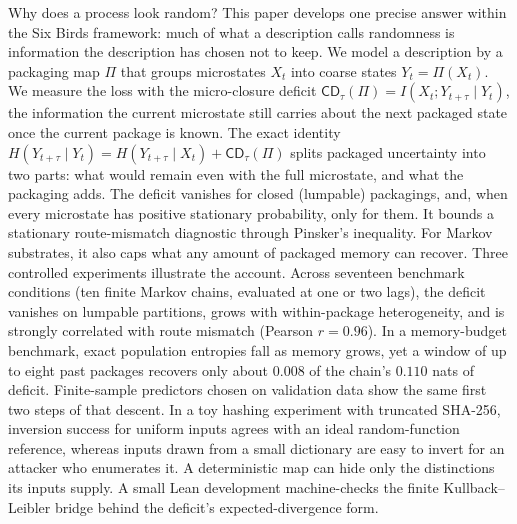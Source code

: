 Why does a process look random? This paper develops one precise answer within the Six Birds framework: much of what a description calls randomness is information the description has chosen not to keep. We model a description by a packaging map $\Pi$ that groups microstates $X_t$ into coarse states $Y_t=\Pi(X_t)$. We measure the loss with the micro-closure deficit $\mathsf{CD}_\tau(\Pi)=I(X_t;Y_{t+\tau}\mid Y_t)$, the information the current microstate still carries about the next packaged state once the current package is known. The exact identity $H(Y_{t+\tau}\mid Y_t)=H(Y_{t+\tau}\mid X_t)+\mathsf{CD}_\tau(\Pi)$ splits packaged uncertainty into two parts: what would remain even with the full microstate, and what the packaging adds. The deficit vanishes for closed (lumpable) packagings, and, when every microstate has positive stationary probability, only for them. It bounds a stationary route-mismatch diagnostic through Pinsker's inequality. For Markov substrates, it also caps what any amount of packaged memory can recover. Three controlled experiments illustrate the account. Across seventeen benchmark conditions (ten finite Markov chains, evaluated at one or two lags), the deficit vanishes on lumpable partitions, grows with within-package heterogeneity, and is strongly correlated with route mismatch (Pearson $r=0.96$). In a memory-budget benchmark, exact population entropies fall as memory grows, yet a window of up to eight past packages recovers only about $0.008$ of the chain's $0.110$ nats of deficit. Finite-sample predictors chosen on validation data show the same first two steps of that descent. In a toy hashing experiment with truncated SHA-256, inversion success for uniform inputs agrees with an ideal random-function reference, whereas inputs drawn from a small dictionary are easy to invert for an attacker who enumerates it. A deterministic map can hide only the distinctions its inputs supply. A small Lean development machine-checks the finite Kullback--Leibler bridge behind the deficit's expected-divergence form.
